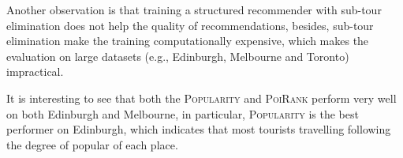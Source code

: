 Another observation is that training a structured recommender with sub-tour elimination does not help the quality of recommendations,
besides, sub-tour elimination make the training computationally expensive, which makes the evaluation on large datasets 
(e.g., Edinburgh, Melbourne and Toronto) impractical.

It is interesting to see that both the \textsc{Popularity} and \textsc{PoiRank} perform very well on both Edinburgh and Melbourne,
in particular, \textsc{Popularity} is the best performer on Edinburgh, which indicates that most tourists travelling following the degree 
of popular of each place.
